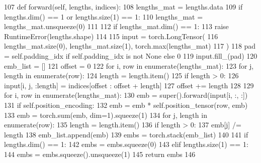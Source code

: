 \begin{DoxyCode}
107     \textcolor{keyword}{def }forward(self, lengths, indices):
108         lengths\_mat = lengths.data
109         \textcolor{keywordflow}{if} lengths.dim() == 1 \textcolor{keywordflow}{or} lengths.size(1) == 1:
110             lengths\_mat = lengths\_mat.unsqueeze(0)
111 
112         \textcolor{keywordflow}{if} lengths\_mat.dim() == 1:
113             \textcolor{keywordflow}{raise} RuntimeError(lengths.shape)
114 
115         input = torch.LongTensor(
116             lengths\_mat.size(0), lengths\_mat.size(1), torch.max(lengths\_mat)
117         )
118         pad = self.padding\_idx \textcolor{keywordflow}{if} self.padding\_idx \textcolor{keywordflow}{is} \textcolor{keywordflow}{not} \textcolor{keywordtype}{None} \textcolor{keywordflow}{else} 0
119         input.fill\_(pad)
120         emb\_list = []
121         offset = 0
122         \textcolor{keywordflow}{for} i, row \textcolor{keywordflow}{in} enumerate(lengths\_mat):
123             \textcolor{keywordflow}{for} j, length \textcolor{keywordflow}{in} enumerate(row):
124                 length = length.item()
125                 \textcolor{keywordflow}{if} length > 0:
126                     input[i, j, :length] = indices[offset : offset + length]
127                 offset += length
128 
129         \textcolor{keywordflow}{for} i, row \textcolor{keywordflow}{in} enumerate(lengths\_mat):
130             emb = super().forward(input[i, :, :])
131             \textcolor{keywordflow}{if} self.position\_encoding:
132                 emb = emb * self.position\_tensor(row, emb)
133             emb = torch.sum(emb, dim=1).squeeze(1)
134             \textcolor{keywordflow}{for} j, length \textcolor{keywordflow}{in} enumerate(row):
135                 length = length.item()
136                 \textcolor{keywordflow}{if} length > 0:
137                     emb[j] /= length
138             emb\_list.append(emb)
139         embs = torch.stack(emb\_list)
140 
141         \textcolor{keywordflow}{if} lengths.dim() == 1:
142             embs = embs.squeeze(0)
143         \textcolor{keywordflow}{elif} lengths.size(1) == 1:
144             embs = embs.squeeze().unsqueeze(1)
145         \textcolor{keywordflow}{return} embs
146 
\end{DoxyCode}
\mbox{\label{classparlai_1_1agents_1_1legacy__agents_1_1memnn_1_1modules__v0_1_1Embed_aac0da7cbc9d64949060c6c681172220f}} 
